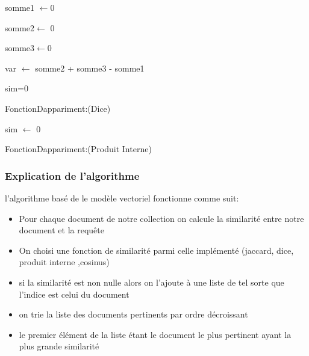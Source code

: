 \documentclass[12pt,a4paper,oneside]{article}
\begin{document}
\begin{algorithm}[H]
	\DontPrintSemicolon
	
	somme1 $\gets$0
	
	somme2$\gets$ 0
	
	somme3$\gets$0
	
	
	
	var  $\gets$ somme2 + somme3 - somme1
	
	{
		sim=0}
	
	
	
	\;
	\caption{{\sc FonctionDappariment:(Dice)}}
	\label{algo:duplicate2}
\end{algorithm}


\begin{algorithm}[H]
	\DontPrintSemicolon
	
	sim $\gets$ 0
	
	
	
	\;
	\caption{{\sc FonctionDappariment:(Produit Interne)}}
	\label{algo:duplicate2}
\end{algorithm}


\subsubsection*{Explication de l'algorithme}
l'algorithme basé de le modèle vectoriel fonctionne comme suit: 

\begin{itemize}
	\item  Pour chaque document de notre collection on calcule la similarité entre notre document et la requête
	\item On choisi une fonction de similarité parmi celle implémenté (jaccard, dice, produit interne ,cosinus)
	\item si la similarité est non nulle alors on l'ajoute à une liste de tel sorte que l'indice est celui du document 
	\item on trie la liste des documents pertinents par ordre décroissant
	\item le premier élément de la liste étant le document le plus pertinent ayant la plus grande similarité 
\end{itemize}
\end{document}

